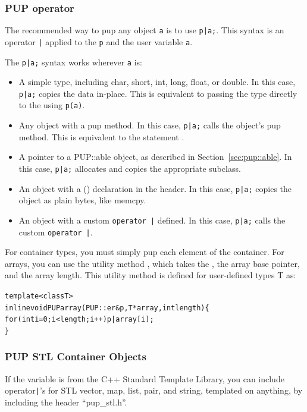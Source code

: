 \subsubsection{PUP operator}
\label{sec:pupoperator}

The recommended way to pup any object \verb.a. is to use \verb.p|a;..
This syntax is an operator \verb.|. applied to the  \verb.p.
and the user variable \verb.a..

The \verb.p|a;. syntax works wherever \verb.a. is:

\begin{itemize}
 \item A simple type, including char, short, int, long, float, or double.
    In this case, \verb.p|a;. copies the data in-place.
    This is equivalent to passing the type directly to the    
       using \verb.p(a)..
 \item Any object with a pup method.
    In this case, \verb.p|a;. calls the object's pup method.
    This is equivalent to the statement . 
 \item A pointer to a PUP::able object, as described in Section~\ref{sec:pup::able}.
    In this case, \verb.p|a;. allocates and copies the appropriate subclass.
 \item An object with a () declaration in the header.
    In this case, \verb.p|a;. copies the object as plain bytes, like memcpy.
 \item An object with a custom \verb.operator |. defined.
    In this case, \verb.p|a;. calls the custom \verb.operator |..
\end{itemize}



For container types, you must simply pup each element of the container.
For arrays, you can use the utility method , which takes
the , the array base pointer, and the array length.
This utility method is defined for user-defined types T as:
  \begin{alltt}
    template<class T>
    inline void PUParray(PUP::er &p,T *array,int length) \{
       for (int i=0;i<length;i++) p|array[i];
    \}
  \end{alltt}

\subsubsection{PUP STL Container Objects}
\label{sec:pupstl}
If the variable is from the C++ Standard Template Library, you can include 
operator\verb.|.'s for STL vector, map, list, pair, and string, templated
on anything, by including the header ``pup\_stl.h''.

